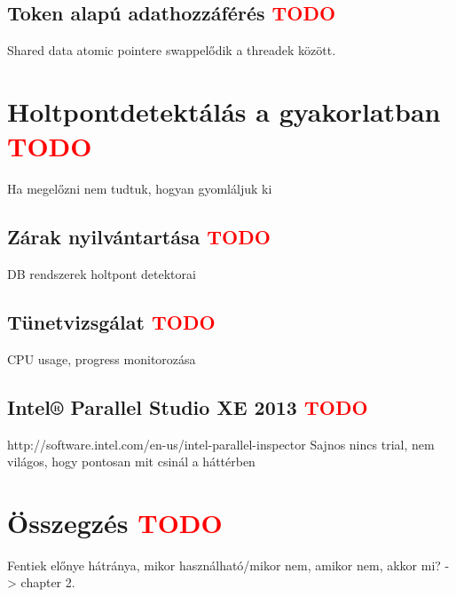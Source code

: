     \subsection{Token alapú adathozzáférés \textcolor{red}{TODO}} Shared data atomic pointere swappelődik a threadek között.

\section{Holtpontdetektálás a gyakorlatban \textcolor{red}{TODO}} 
\label{sec:dl-avoiding}
Ha megelőzni nem tudtuk, hogyan gyomláljuk ki
    \subsection{Zárak nyilvántartása \textcolor{red}{TODO}} DB rendszerek holtpont detektorai
    \subsection{Tünetvizsgálat \textcolor{red}{TODO}} CPU usage, progress monitorozása
    \subsection{Intel® Parallel Studio XE 2013 \textcolor{red}{TODO}} http://software.intel.com/en-us/intel-parallel-inspector Sajnos nincs trial, nem világos, hogy pontosan mit csinál a háttérben
    
\section{Összegzés \textcolor{red}{TODO}} 
Fentiek előnye hátránya, mikor használható/mikor nem, amikor nem, akkor mi? -> chapter 2.
